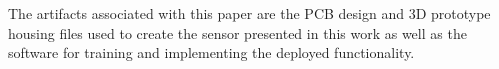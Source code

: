 The artifacts associated with this paper are the PCB design and 3D prototype housing files used to create the sensor presented in this work as well as the software for training and implementing the deployed \sysname functionality. 